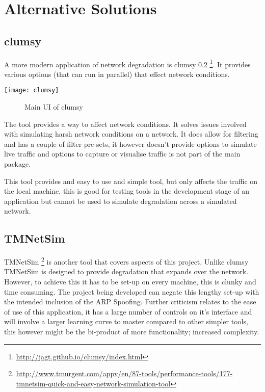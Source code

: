 \section{Alternative Solutions}
\subsection{clumsy}
A more modern application of network degradation is clumsy 0.2 \footnote{\url{http://jagt.github.io/clumsy/index.html}}. It provides various options (that can run in parallel) that effect network conditions. 

\begin{center}
	\texttt{[image: clumsy]}
	\begin{figure}[h]
		\caption{Main UI of clumsy}
	\end{figure}
\end{center}

The tool provides a way to affect network conditions. It solves issues involved with simulating harsh network conditions on a network. It does allow for filtering and has a couple of filter pre-sets, it however doesn't provide options to simulate live traffic and options to capture or visualise traffic is not part of the main package.

This tool provides and easy to use and simple tool, but only affects the traffic on the local machine, this is good for testing tools in the development stage of an application but cannot be used to simulate degradation across a simulated network.

\subsection{TMNetSim}
TMNetSim \footnote{\url{http://www.tmurgent.com/appv/en/87-tools/performance-tools/177-tmnetsim-quick-and-easy-network-simulation-tool}} is another tool that covers aspects of this project. Unlike clumsy TMNetSim is designed to provide degradation that expands over the network. However, to achieve this it has to be set-up on every machine, this is clunky and time consuming. The project being developed can negate this lengthy set-up with the intended inclusion of the ARP Spoofing. Further criticism relates to the ease of use of this application, it has a large number of controls on it's interface and will involve a larger learning curve to master compared to other simpler tools, this however might be the bi-product of more functionality; increased complexity.

